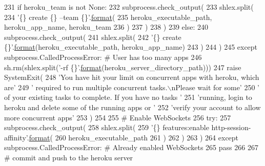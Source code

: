 \begin{DoxyCode}
231         \textcolor{keywordflow}{if} heroku\_team \textcolor{keywordflow}{is} \textcolor{keywordflow}{not} \textcolor{keywordtype}{None}:
232             subprocess.check\_output(
233                 shlex.split(
234                     \textcolor{stringliteral}{'\{\} create \{\} --team \{\}'}.\hyperlink{namespaceparlai_1_1chat__service_1_1services_1_1messenger_1_1shared__utils_a32e2e2022b824fbaf80c747160b52a76}{format}(
235                         heroku\_executable\_path, heroku\_app\_name, heroku\_team
236                     )
237                 )
238             )
239         \textcolor{keywordflow}{else}:
240             subprocess.check\_output(
241                 shlex.split(
242                     \textcolor{stringliteral}{'\{\} create \{\}'}.\hyperlink{namespaceparlai_1_1chat__service_1_1services_1_1messenger_1_1shared__utils_a32e2e2022b824fbaf80c747160b52a76}{format}(heroku\_executable\_path, heroku\_app\_name)
243                 )
244             )
245     \textcolor{keywordflow}{except} subprocess.CalledProcessError:  \textcolor{comment}{# User has too many apps}
246         sh.rm(shlex.split(\textcolor{stringliteral}{'-rf \{\}'}.\hyperlink{namespaceparlai_1_1chat__service_1_1services_1_1messenger_1_1shared__utils_a32e2e2022b824fbaf80c747160b52a76}{format}(heroku\_server\_directory\_path)))
247         \textcolor{keywordflow}{raise} SystemExit(
248             \textcolor{stringliteral}{'You have hit your limit on concurrent apps with heroku, which are'}
249             \textcolor{stringliteral}{' required to run multiple concurrent tasks.\(\backslash\)nPlease wait for some'}
250             \textcolor{stringliteral}{' of your existing tasks to complete. If you have no tasks '}
251             \textcolor{stringliteral}{'running, login to heroku and delete some of the running apps or '}
252             \textcolor{stringliteral}{'verify your account to allow more concurrent apps'}
253         )
254 
255     \textcolor{comment}{# Enable WebSockets}
256     \textcolor{keywordflow}{try}:
257         subprocess.check\_output(
258             shlex.split(
259                 \textcolor{stringliteral}{'\{\} features:enable http-session-affinity'}.\hyperlink{namespaceparlai_1_1chat__service_1_1services_1_1messenger_1_1shared__utils_a32e2e2022b824fbaf80c747160b52a76}{format}(
260                     heroku\_executable\_path
261                 )
262             )
263         )
264     \textcolor{keywordflow}{except} subprocess.CalledProcessError:  \textcolor{comment}{# Already enabled WebSockets}
265         \textcolor{keywordflow}{pass}
266 
267     \textcolor{comment}{# commit and push to the heroku server}

\end{DoxyCode}
